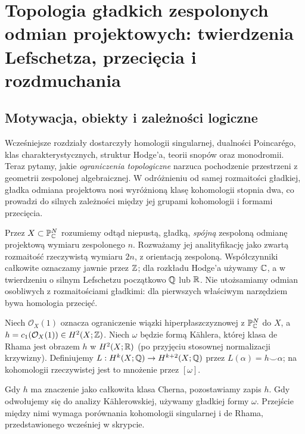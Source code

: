 \chapter{Topologia gładkich zespolonych odmian projektowych: twierdzenia Lefschetza, przecięcia i rozdmuchania}
\label{ch:xvii-topologia-odmian}

\section{Motywacja, obiekty i zależności logiczne}
Wcześniejsze rozdziały dostarczyły homologii singularnej, dualności
Poincarégo, klas charakterystycznych, struktur Hodge'a, teorii snopów
oraz monodromii. Teraz pytamy, jakie \emph{ograniczenia topologiczne}
narzuca pochodzenie przestrzeni z geometrii zespolonej algebraicznej.
W odróżnieniu od samej rozmaitości gładkiej, gładka odmiana projektowa
nosi wyróżnioną klasę kohomologii stopnia dwa, co prowadzi do
silnych zależności między jej grupami kohomologii i formami przecięcia.

Przez $X\subset\mathbb P^N_{\mathbb{C}}$ rozumiemy odtąd niepustą,
gładką, \emph{spójną} zespoloną odmianę projektową wymiaru zespolonego
$n$. Rozważamy jej analityfikację jako zwartą rozmaitość
rzeczywistą wymiaru $2n$, z orientacją zespoloną. Współczynniki
całkowite oznaczamy jawnie przez $\mathbb{Z}$; dla rozkładu Hodge'a używamy
$\mathbb{C}$, a w twierdzeniu o silnym Lefschetzu początkowo $\mathbb{Q}$ lub $\mathbb{R}$.
Nie utożsamiamy odmian osobliwych z rozmaitościami gładkimi: dla
pierwszych właściwym narzędziem bywa homologia przecięć.

\begin{definicja}
Niech $\mathcal O_X(1)$ oznacza ograniczenie wiązki hiperpłaszczyznowej
z $\mathbb P^N_{\mathbb{C}}$ do $X$, a $h=c_1(\mathcal O_X(1))\in
H^2(X;\mathbb{Z})$. Niech $\omega$ będzie formą Kählera, której klasa
de Rhama jest obrazem $h$ w $H^2(X;\mathbb{R})$ (po przyjęciu stosownej
normalizacji krzywizny). Definiujemy
$L:H^k(X;\mathbb{Q})\to H^{k+2}(X;\mathbb{Q})$ przez $L(\alpha)=h\smile\alpha$;
na kohomologii rzeczywistej jest to mnożenie przez $[\omega]$.
\end{definicja}
\begin{uwaga}
Gdy $h$ ma znaczenie jako całkowita klasa Cherna, pozostawiamy
zapis $h$. Gdy odwołujemy się do analizy Kählerowskiej,
używamy gładkiej formy $\omega$. Przejście między nimi wymaga
porównania kohomologii singularnej i de Rhama, przedstawionego
wcześniej w skrypcie.
\end{uwaga}

